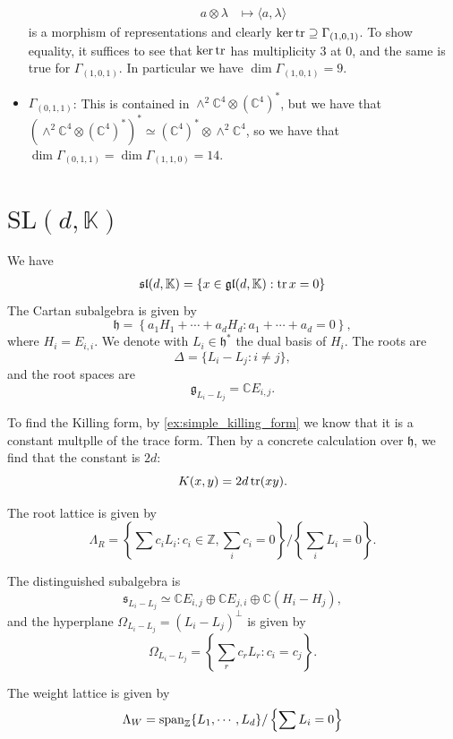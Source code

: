 \documentclass{report}
\begin{document}
\begin{itemize}
\begin{align*}
        a \otimes \lambda &\mapsto \langle a, \lambda \rangle
    \end{align*}
    is a morphism of representations and clearly $\ker \operatorname{tr} \supseteq \Gamma_{(1,0,1)}$.
    To show equality, it suffices to see that $\ker \operatorname{tr}$ has multiplicity $3$ at $0$, and the same is true for $\Gamma_{(1,0,1)}$.
    In particular we have $\dim \Gamma_{(1,0,1)} = 9$.
    \item {\bf \underline{$\Gamma_{(0,1,1)}$}}: This is contained in $\wedge^2 \mathbb C^4 \otimes (\mathbb C^4)^*$, but we have that $\left(\wedge^2 \mathbb C^4 \otimes (\mathbb C^4)^*\right)^* \simeq (\mathbb C^4)^* \otimes \wedge^2 \mathbb C^4$, so we have that $\dim \Gamma_{(0,1,1)} = \dim \Gamma_{(1,1,0)} = 14$.
    
\end{itemize}

\section{$\mathrm{SL}(d, \mathbb K)$}
We have
\begin{align*}
    \mathfrak{sl}(d, \mathbb K) &= \{ x \in \operatorname{{\mathfrak{gl}}}(d, \mathbb K) : \operatorname{tr} x = 0\}\\
\end{align*}
The Cartan subalgebra is given by
\[
\mathfrak h = \left\{ a_1 H_1 + \cdots + a_d H_d : a_1 + \cdots + a_d = 0 \right\},
\]
where $H_i = E_{i,i}$.
We denote with $L_i \in \mathfrak h^*$ the dual basis of $H_i$.
The roots are 
\[
    \Delta = \{ L_i - L_j : i \neq j \},
\] 
and the root spaces are $$\mathfrak g_{L_i - L_j} = \mathbb C E_{i,j}.$$

To find the Killing form, by \cref{ex:simple_killing_form} we know that it is a constant multplle of the trace form.
Then by a concrete calculation over $\mathfrak h$, we find that the constant is $2d$:
\[
K(x, y) = 2d \operatorname{tr}(xy).
\]

The root lattice is given by
\[
\Lambda_R = \left\{ \sum c_i L_i : c_i \in \mathbb Z, \sum_i c_i = 0 \right\}/\left\{ \sum_i L_i = 0 \right\}.
\]

The distinguished subalgebra is 
$$\mathfrak s_{L_i - L_j} \simeq \mathbb C E_{i,j} \oplus \mathbb C E_{j,i} \oplus \mathbb C (H_i - H_j),$$
and the hyperplane $\Omega_{L_i - L_j} = (L_i - L_j)^\perp$ is given by
\[
\Omega_{L_i - L_j} = \left\{ \sum_r c_r L_r : c_i = c_j \right\}.
\]

The weight lattice is given by 
\[
\Lambda_W = \operatorname{span}_{\mathbb Z} \{L_1, \cdots, L_d\} / \left\{ \sum L_i = 0  \right\}
\]
\end{document}
